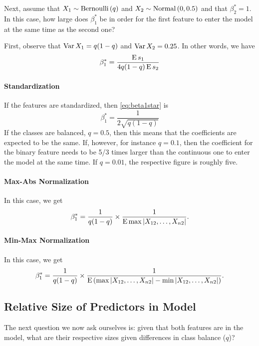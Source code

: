 Next, assume that \(X_1 \sim \operatorname{Bernoulli}{(q)}\) and \(X_2 \sim \operatorname{Normal}{(0, 0.5)}\) and that \(\beta^*_2 = 1\). In this case, how large does \(\beta^*_1\) be in order for the first feature to enter the model at the same time as the second one?

First, observe that \(\operatorname{Var}{X_1} = q(1 - q)\) and \(\operatorname{Var}{X_2} = 0.25\). In other words, we have
\begin{equation}
  \label{eq:beta1star}
  \beta^*_1 = \frac{\operatorname{E} s_1}{4q(1-q)\operatorname{E} s_2}
\end{equation}

\paragraph{Standardization} If the features are standardized, then \eqref{eq:beta1star} is
\[
  \beta^*_1 = \frac{1}{2\sqrt{q(1-q)}}
\]
If the classes are balanced, \(q = 0.5\), then this means that the coefficients are expected to be the same. If, however, for instance \(q = 0.1\), then the coefficient for the binary feature needs to be 5/3 times larger than the continuous one to enter the model at the same time. If \(q=0.01\), the respective figure is roughly five.

\paragraph{Max-Abs Normalization} In this case, we get
\[
  \beta^*_1 = \frac{1}{q(1 - q)} \times \frac{1}{\operatorname{E} \max | X_{12}, \dots,  X_{n2} |}.
\]

\paragraph{Min-Max Normalization} In this case, we get
\[
  \beta^*_1 = \frac{1}{q(1 - q)} \times \frac{1}{\operatorname{E} \left(\max | X_{12}, \dots,  X_{n2}| - \min | X_{12}, \dots,  X_{n2} |\right)}.
\]

\subsection{Relative Size of Predictors in Model}

The next question we now ask ourselves is: given that both features are in the model, what are their respective sizes given differences in class balance (\(q\))?

